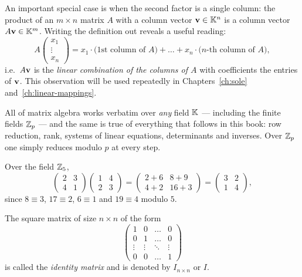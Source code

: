 \begin{remark}
An important special case is when the second factor is a single column: the product of an $m\times n$
matrix $A$ with a column vector $\mathbf{v}\in\mathbb{K}^n$ is a column vector $A\mathbf{v}\in\mathbb{K}^m$. Writing the definition out reveals a useful reading:
\[
A \left(\begin{array}{c} x_1\\ \vdots\\ x_n\end{array}\right)
= x_1\cdot \big(\text{1st column of } A\big) + \ldots + x_n\cdot \big(\text{$n$-th column of } A\big),
\]
i.e.\ $A\mathbf{v}$ is the \emph{linear combination of the columns of $A$} with coefficients the entries of
$\mathbf{v}$. This observation will be used repeatedly in Chapters~\ref{ch:sole} and~\ref{ch:linear-mappings}.
\end{remark}

\begin{remark}
All of matrix algebra works verbatim over \emph{any} field $\mathbb{K}$ — including the finite fields $\mathbb{Z}_p$ —
and the same is true of everything that follows in this book: row reduction, rank, systems of linear
equations, determinants and inverses. Over $\mathbb{Z}_p$ one simply reduces modulo $p$ at every step.
\end{remark}

\begin{example}
Over the field $\mathbb{Z}_5$,
\[
\left( \begin{array}{cc} 2 & 3 \\ 4 & 1 \end{array} \right)
\left( \begin{array}{cc} 1 & 4 \\ 2 & 3 \end{array} \right)
= \left( \begin{array}{cc} 2+6 & 8+9 \\ 4+2 & 16+3 \end{array} \right)
= \left( \begin{array}{cc} 3 & 2 \\ 1 & 4 \end{array} \right),
\]
since $8 \equiv 3$, $17 \equiv 2$, $6\equiv 1$ and $19 \equiv 4$ modulo $5$.
\end{example}

\begin{definition}
The square matrix of size $n\times n$ of the form
\[
\left( \begin{array}{cccc}
1 & 0 & \ldots & 0 \\
0 & 1 & \ldots & 0 \\
\vdots & \vdots & \ddots & \vdots \\
0 & 0 & \ldots & 1
\end{array} \right)
\]
is called the \emph{identity matrix} and is denoted by $I_{n\times n}$ or $I$.
\end{definition}

